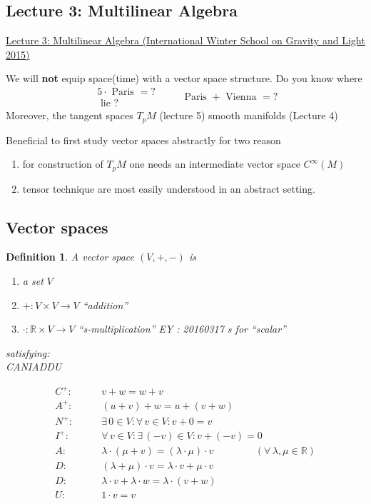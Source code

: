 \documentclass[10pt]{amsart}
\newtheorem{definition}{Definition}
\begin{document}
\begin{multicols*}{2}
\section{Lecture 3: Multilinear Algebra}

\href{https://youtu.be/mbv3T15nWq0}{Lecture 3: Multilinear Algebra (International Winter School on Gravity and Light 2015)}

We will \textbf{not} equip space(time) with a vector space structure.  Do you know where 
\[
\begin{gathered} 5 \cdot \text{ Paris } = ? \\
\text{ lie ? } \end{gathered}
\qquad \, \text{ Paris } + \text{ Vienna } = ?
\]
Moreover, the tangent spaces $T_pM$ (lecture 5) smooth manifolds (Lecture 4)

Beneficial to first study vector spaces abstractly for two reason 
\begin{enumerate}
	\item[(i)] for construction of $T_pM$ one needs an intermediate vector space $C^{\infty}(M)$
	\item[(ii)] tensor technique are most easily understood in an abstract setting.  
\end{enumerate}

\subsection{Vector spaces}

\begin{definition} A vector space $(V,+,-)$ is 
	\begin{enumerate}
		\item[(i)] a set $V$
		\item[(ii)] $+ : V\times V \to V$ \qquad ``addition''
		\item[(iii)] $\cdot : \mathbb{R} \times V \to V$ \qquad  ``s-multiplication'' EY : 20160317 s for ``scalar''
	\end{enumerate}
	satisfying: \\
	
	CANIADDU
	
	\[
	\begin{aligned}
	C^+ : & \qquad v+w = w+v \\
	A^+ : & \qquad (u+v)+w = u+(v+w) \\ 
	N^+ : & \qquad \exists \, 0 \in V : \forall \, v \in V : v+ 0 = v \\
	I^+ : & \qquad \forall \, v \in V : \exists \, (-v) \in V: v + (-v) = 0  \\
	A : & \qquad \lambda \cdot (\mu + v) = (\lambda \cdot \mu)\cdot v \qquad \qquad \, (\forall \, \lambda , \mu \in \mathbb{R} ) \\ 
	D : &  \qquad (\lambda + \mu ) \cdot v = \lambda \cdot v + \mu \cdot v \\
	D : &  \qquad \lambda \cdot v + \lambda \cdot w = \lambda \cdot (v+w)  \\ 
	U : &  \qquad 1 \cdot v = v 
	\end{aligned}
	\]
\end{definition}

\end{multicols*}
\end{document}
